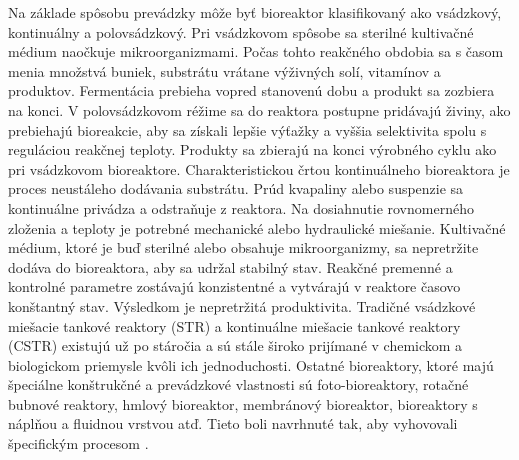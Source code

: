 Na základe spôsobu prevádzky môže byť bioreaktor klasifikovaný ako vsádzkový, kontinuálny a polovsádzkový. 
Pri vsádzkovom spôsobe sa sterilné kultivačné médium naočkuje mikroorganizmami. Počas tohto reakčného obdobia sa s časom menia množstvá buniek, substrátu vrátane výživných solí, vitamínov a produktov. Fermentácia prebieha vopred stanovenú dobu a produkt sa zozbiera na konci.
V polovsádzkovom réžime sa do reaktora postupne pridávajú živiny, ako
prebiehajú bioreakcie, aby sa získali lepšie výťažky a vyššia selektivita spolu s reguláciou reakčnej teploty. Produkty sa zbierajú na konci výrobného cyklu ako pri vsádzkovom bioreaktore.
Charakteristickou črtou kontinuálneho bioreaktora je proces neustáleho dodávania substrátu. Prúd kvapaliny alebo suspenzie sa kontinuálne privádza a odstraňuje z reaktora. Na dosiahnutie rovnomerného zloženia a teploty je potrebné mechanické alebo hydraulické miešanie. Kultivačné médium, ktoré je buď sterilné alebo obsahuje mikroorganizmy, sa nepretržite dodáva do bioreaktora, aby sa udržal stabilný stav. Reakčné premenné a kontrolné parametre zostávajú konzistentné a vytvárajú v reaktore časovo konštantný stav. Výsledkom je nepretržitá produktivita.
Tradičné vsádzkové miešacie tankové reaktory (STR) a kontinuálne miešacie tankové
reaktory (CSTR)
existujú už po stáročia a sú stále široko prijímané v chemickom a biologickom priemysle kvôli ich jednoduchosti. Ostatné bioreaktory, ktoré majú špeciálne konštrukčné a prevádzkové vlastnosti sú foto-bioreaktory, rotačné bubnové reaktory, hmlový bioreaktor, membránový bioreaktor, bioreaktory s náplňou a fluidnou vrstvou atď. Tieto boli navrhnuté tak, aby vyhovovali špecifickým procesom \cite{ref1}.
